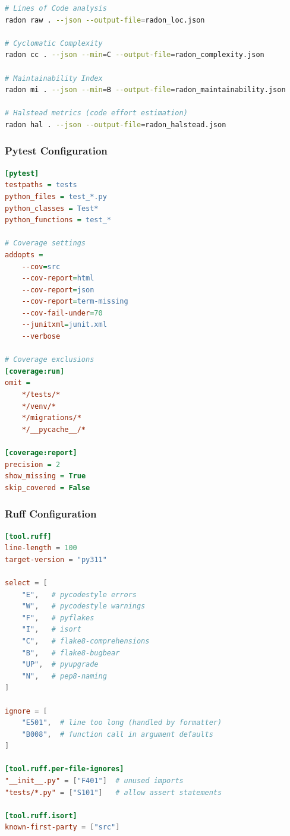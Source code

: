 \begin{lstlisting}[language=bash, caption=Radon Analysis Commands]
# Lines of Code analysis
radon raw . --json --output-file=radon_loc.json

# Cyclomatic Complexity
radon cc . --json --min=C --output-file=radon_complexity.json

# Maintainability Index
radon mi . --json --min=B --output-file=radon_maintainability.json

# Halstead metrics (code effort estimation)
radon hal . --json --output-file=radon_halstead.json
\end{lstlisting}

\subsubsection{Pytest Configuration}

\begin{lstlisting}[language=ini, caption=pytest.ini]
[pytest]
testpaths = tests
python_files = test_*.py
python_classes = Test*
python_functions = test_*

# Coverage settings
addopts =
    --cov=src
    --cov-report=html
    --cov-report=json
    --cov-report=term-missing
    --cov-fail-under=70
    --junitxml=junit.xml
    --verbose

# Coverage exclusions
[coverage:run]
omit =
    */tests/*
    */venv/*
    */migrations/*
    */__pycache__/*

[coverage:report]
precision = 2
show_missing = True
skip_covered = False
\end{lstlisting}

\subsubsection{Ruff Configuration}

\begin{lstlisting}[language=toml, caption=pyproject.toml - Ruff Configuration]
[tool.ruff]
line-length = 100
target-version = "py311"

select = [
    "E",   # pycodestyle errors
    "W",   # pycodestyle warnings
    "F",   # pyflakes
    "I",   # isort
    "C",   # flake8-comprehensions
    "B",   # flake8-bugbear
    "UP",  # pyupgrade
    "N",   # pep8-naming
]

ignore = [
    "E501",  # line too long (handled by formatter)
    "B008",  # function call in argument defaults
]

[tool.ruff.per-file-ignores]
"__init__.py" = ["F401"]  # unused imports
"tests/*.py" = ["S101"]   # allow assert statements

[tool.ruff.isort]
known-first-party = ["src"]
\end{lstlisting}

